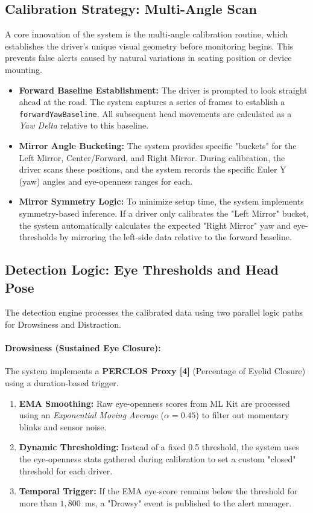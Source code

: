 \documentclass[11pt]{report}
\begin{document}
\subsection{Calibration Strategy: Multi-Angle Scan}
A core innovation of the system is the multi-angle calibration routine, which establishes the driver's unique visual geometry before monitoring begins. This prevents false alerts caused by natural variations in seating position or device mounting.

\begin{itemize}
    \item \textbf{Forward Baseline Establishment:} The driver is prompted to look straight ahead at the road. The system captures a series of frames to establish a \texttt{forwardYawBaseline}. All subsequent head movements are calculated as a \textit{Yaw Delta} relative to this baseline.
    \item \textbf{Mirror Angle Bucketing:} The system provides specific "buckets" for the Left Mirror, Center/Forward, and Right Mirror. During calibration, the driver scans these positions, and the system records the specific Euler Y (yaw) angles and eye-openness ranges for each.
    \item \textbf{Mirror Symmetry Logic:} To minimize setup time, the system implements symmetry-based inference. If a driver only calibrates the "Left Mirror" bucket, the system automatically calculates the expected "Right Mirror" yaw and eye-thresholds by mirroring the left-side data relative to the forward baseline.
\end{itemize}

\subsection{Detection Logic: Eye Thresholds and Head Pose}
The detection engine processes the calibrated data using two parallel logic paths for Drowsiness and Distraction.

\paragraph{Drowsiness (Sustained Eye Closure):}
The system implements a \textbf{PERCLOS Proxy [4]} (Percentage of Eyelid Closure) using a duration-based trigger.
\begin{enumerate}
    \item \textbf{EMA Smoothing:} Raw eye-openness scores from ML Kit are processed using an \textit{Exponential Moving Average} ($\alpha = 0.45$) to filter out momentary blinks and sensor noise.
    \item \textbf{Dynamic Thresholding:} Instead of a fixed 0.5 threshold, the system uses the eye-openness stats gathered during calibration to set a custom "closed" threshold for each driver.
    \item \textbf{Temporal Trigger:} If the EMA eye-score remains below the threshold for more than $1,800$~ms, a "Drowsy" event is published to the alert manager.
\end{enumerate}
\end{document}
